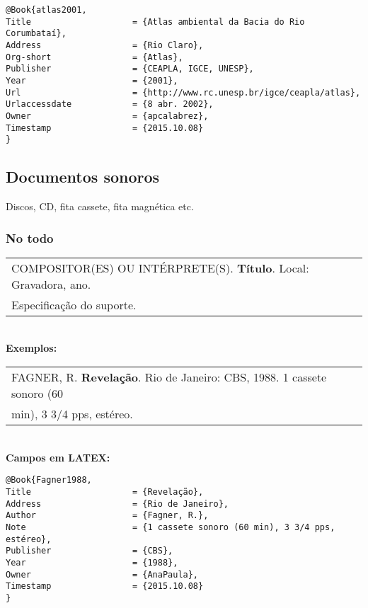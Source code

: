 \begin{verbatim}
@Book{atlas2001,
Title                    = {Atlas ambiental da Bacia do Rio Corumbataí},
Address                  = {Rio Claro},
Org-short                = {Atlas},
Publisher                = {CEAPLA, IGCE, UNESP},
Year                     = {2001},
Url                      = {http://www.rc.unesp.br/igce/ceapla/atlas},
Urlaccessdate            = {8 abr. 2002},
Owner                    = {apcalabrez},
Timestamp                = {2015.10.08}
}
\end{verbatim}

\subsection{Documentos sonoros}

Discos, CD, fita cassete, fita magnética etc. \\
\subsubsection{No todo}

\begin{tabular}{|l|c|} \hline
COMPOSITOR(ES) OU INTÉRPRETE(S). \textbf{Título}. Local: Gravadora, ano. \\
Especificação do suporte. 
	\\\hline
\end{tabular} \\

\textbf{Exemplos:} \\

\begin{tabular}{|l|c|} \hline
FAGNER, R. \textbf{Revelação}. Rio de Janeiro: CBS, 1988. 1 cassete sonoro (60 \\
min), 3 3/4 pps, estéreo.  
	\\\hline
\end{tabular} \\

\textbf{Campos em LATEX:} 

\begin{verbatim}
@Book{Fagner1988,
Title                    = {Revelação},
Address                  = {Rio de Janeiro},
Author                   = {Fagner, R.},
Note                     = {1 cassete sonoro (60 min), 3 3/4 pps, 
estéreo},
Publisher                = {CBS},
Year                     = {1988},
Owner                    = {AnaPaula},
Timestamp                = {2015.10.08}
}
\end{verbatim}


